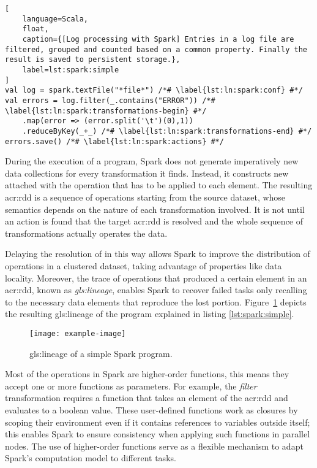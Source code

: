 \begin{lstlisting}[
	language=Scala,
	float,
	caption={[Log processing with Spark] Entries in a log file are filtered, grouped and counted based on a common property. Finally the result is saved to persistent storage.},
	label=lst:spark:simple
]
val log = spark.textFile("*file*") /*# \label{lst:ln:spark:conf} #*/
val errors = log.filter(_.contains("ERROR")) /*# \label{lst:ln:spark:transformations-begin} #*/
	.map(error => (error.split('\t')(0),1))
	.reduceByKey(_+_) /*# \label{lst:ln:spark:transformations-end} #*/
errors.save() /*# \label{lst:ln:spark:actions} #*/
\end{lstlisting}

During the execution of a program, Spark does not generate imperatively new data collections for every transformation it finds. Instead, it constructs new  attached with the operation that has to be applied to each element. The resulting \acrshort{acr:rdd} is a sequence of operations starting from the source dataset, whose semantics depends on the nature of each transformation involved. It is not until an action is found that the target \acrshort{acr:rdd} is resolved and the whole sequence of transformations actually operates the data. 

Delaying the resolution of  in this way allows Spark to improve the distribution of operations in a clustered dataset, taking advantage of properties like data locality. Moreover, the trace of operations that produced a certain element in an \acrshort{acr:rdd}, known as \textit{\gls{gls:lineage}}, enables Spark to recover failed tasks only recalling to the necessary data elements that reproduce the lost portion. Figure~\ref{fig:spark:lineage} depicts the resulting \gls{gls:lineage} of the program explained in listing \ref{lst:spark:simple}.


\begin{figure}[t]
\centering
\texttt{[image: example-image]}
\caption{\Gls{gls:lineage} of a simple Spark program.}
\label{fig:spark:lineage}
\end{figure}

Most of the operations in Spark are higher-order functions, this means they accept one or more functions as parameters. For example, the \textit{filter} transformation requires a function that takes an element of the \acrshort{acr:rdd} and evaluates to a boolean value. These user-defined functions work as closures by scoping their environment even if it contains references to variables outside itself; this enables Spark to ensure consistency when applying such functions in parallel nodes. The use of higher-order functions serve as a flexible mechanism to adapt Spark's computation model to different tasks.

